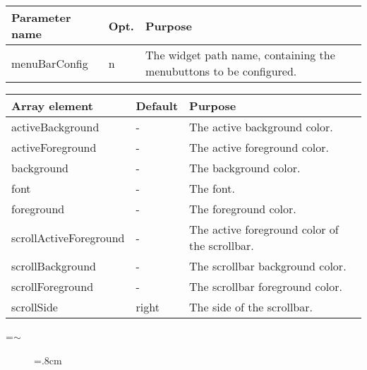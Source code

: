{\newpage
\clearpage
\samepage \begin{tabular}{|l|l|p{6.5cm}|} \hline
Parameter name & Opt. & Purpose \\  \hline
menuBarConfig  & n    & The widget path name, containing the
                        menubuttons to be configured.\\  \hline
\end{tabular}
}

{\newpage
\clearpage
\samepage \begin{tabular}{|l|l|p{5.5cm}|} \hline
Array element          & Default & Purpose\\  \hline
activeBackground       & -       & The active background
                                   color.\\  \hline
activeForeground       & -       & The active foreground
                                   color.\\  \hline
background             & -       & The background color.\\  \hline
font                   & -       & The font.\\  \hline
foreground             & -       & The foreground color.\\  \hline
scrollActiveForeground & -       & The active foreground
                                   color of the scrollbar.\\  \hline
scrollBackground       & -       & The scrollbar background
                                   color.\\  \hline
scrollForeground       & -       & The scrollbar foreground
                                   color.\\  \hline
scrollSide             & right   & The side of the
                                   scrollbar.\\  \hline
\end{tabular}
}

{\newpage
\clearpage
\samepage \setbox\sizebox=\hbox{$\sim$}\box\sizebox
}

{\newpage
\clearpage
\samepage \begin{figure}[ht]
  \centerline{
  \epsfysize=.8cm
  }

  \label{fig:MenuBar}
\end{figure}
}

{\newpage
\clearpage
\samepage \begin{figure}[ht]
  \centerline{
  \epsfysize=11.5cm
  }

  \label{fig:MenuBarConf}
\end{figure}
}

